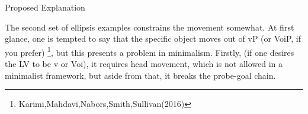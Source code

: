 \documentclass[10pt]{beamer}
\begin{document}
\begin{frame}[fragile]{Proposed Explanation}
  \pause
{}

  \pause
  The second set of ellipsis examples constrains the movement somewhat. At first glance, one is tempted to say that the specific object moves out of vP (or VoiP, if you prefer) \footnote{Karimi,Mahdavi,Nabors,Smith,Sullivan(2016)}, but this presents a problem in minimalism. Firstly, (if one desires the LV to be v or Voi), it requires head movement, which is not allowed in a minimalist framework, but aside from that, it breaks the probe-goal chain. 

  \pause

  
\end{frame}
\end{document}
